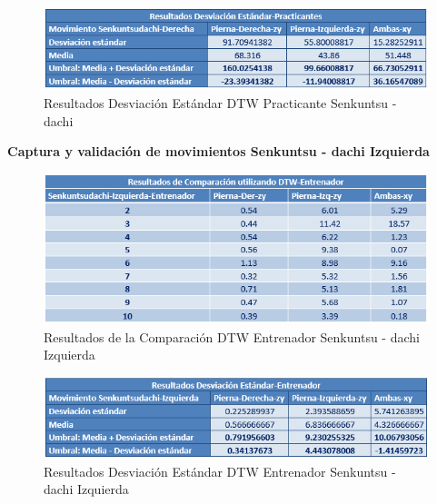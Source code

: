 \begin{figure}[H]%
	\begin{center}
		\includegraphics[scale=1]{./Figuras/Implementacion/Pruebas/Tablas/ResultadorDesvEstandar_Practicante_Senkuntsudachi}
	\end{center}
	\caption{Resultados Desviación Estándar DTW Practicante Senkuntsu - dachi}
	\label{fig:ResultadorDesvEstandar_Practicante_Senkuntsudachi}
\end{figure}
\textbf{Captura y validación de movimientos Senkuntsu - dachi Izquierda}\\
\begin{figure}[H]%
	\begin{center}
		\includegraphics[scale=1]{./Figuras/Implementacion/Pruebas/Tablas/ResultadosDTW_Entrenador_Senkuntsudachi-Izquierdo}
	\end{center}
	\caption{Resultados de la Comparación DTW Entrenador Senkuntsu - dachi Izquierda}
	\label{fig:ResultadosDTW_Entrenador_Senkuntsudachi-Izquierdo}
\end{figure}
\begin{figure}[H]%
	\begin{center}
		\includegraphics[scale=1]{./Figuras/Implementacion/Pruebas/Tablas/ResultadorDesvEstandar_Entrenador_Senkuntsudachi-Izquierdo}
	\end{center}
	\caption{Resultados Desviación Estándar DTW Entrenador Senkuntsu - dachi Izquierda}
	\label{fig:ResultadorDesvEstandar_Entrenador-Izquierdo}
\end{figure}
